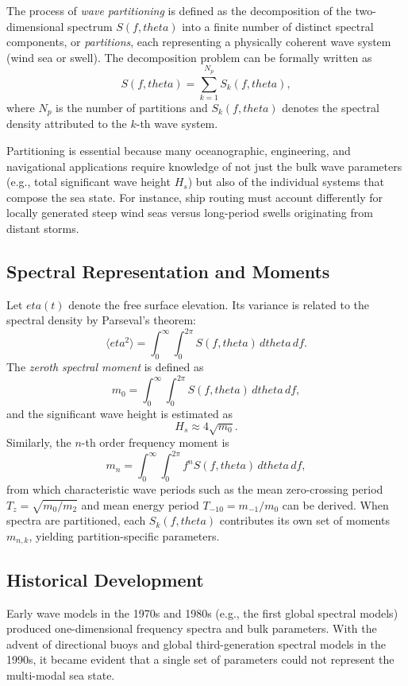 \documentclass[journal,10pt,twocolumn]{IEEEtran}
\def\eta{eta}%
\def\theta{theta}%
\begin{document}
    The process of \emph{wave partitioning} is defined as the decomposition of the two-dimensional spectrum $S(f,\theta)$ into a finite number of distinct spectral components, or \emph{partitions}, each representing a physically coherent wave system (wind sea or swell). The decomposition problem can be formally written as
    \[
        S(f,\theta) = \sum_{k=1}^{N_p} S_k(f,\theta),
    \]
    where $N_p$ is the number of partitions and $S_k(f,\theta)$ denotes the spectral density attributed to the $k$-th wave system.

    Partitioning is essential because many oceanographic, engineering, and navigational applications require knowledge of not just the bulk wave parameters (e.g., total significant wave height $H_s$) but also of the individual systems that compose the sea state. For instance, ship routing must account differently for locally generated steep wind seas versus long-period swells originating from distant storms.

    \subsection{Spectral Representation and Moments}
    Let $\eta(t)$ denote the free surface elevation. Its variance is related to the spectral density by Parseval's theorem:
    \[
        \langle \eta^2 \rangle = \int_{0}^{\infty} \int_{0}^{2\pi} S(f,\theta)\, d\theta\, df.
    \]
    The \emph{zeroth spectral moment} is defined as
    \[
        m_0 = \int_{0}^{\infty} \int_{0}^{2\pi} S(f,\theta)\, d\theta\, df,
    \]
    and the significant wave height is estimated as
    \[
        H_s \approx 4 \sqrt{m_0}.
    \]
    Similarly, the $n$-th order frequency moment is
    \[
        m_n = \int_{0}^{\infty} \int_{0}^{2\pi} f^n S(f,\theta)\, d\theta\, df,
    \]
    from which characteristic wave periods such as the mean zero-crossing period $T_z = \sqrt{m_0/m_2}$ and mean energy period $T_{-10} = m_{-1}/m_0$ can be derived. When spectra are partitioned, each $S_k(f,\theta)$ contributes its own set of moments $m_{n,k}$, yielding partition-specific parameters.

    \subsection{Historical Development}
    Early wave models in the 1970s and 1980s (e.g., the first global spectral models) produced one-dimensional frequency spectra and bulk parameters. With the advent of directional buoys and global third-generation spectral models in the 1990s, it became evident that a single set of parameters could not represent the multi-modal sea state.
\end{document}
